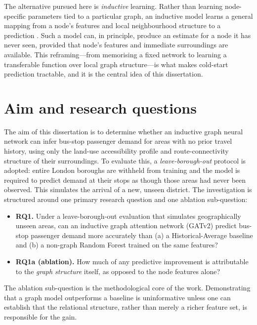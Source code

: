 \documentclass[12pt,a4paper]{report}
\begin{document}
The alternative pursued here is \emph{inductive} learning. Rather than learning
node-specific parameters tied to a particular graph, an inductive model learns
a general mapping from a node's features and local neighbourhood structure to a
prediction \citep{hamilton2017inductive}. Such a model can, in principle,
produce an estimate for a node it has never seen, provided that node's features
and immediate surroundings are available. This reframing---from memorising a
fixed network to learning a transferable function over local graph
structure---is what makes cold-start prediction tractable, and it is the
central idea of this dissertation.

\section{Aim and research questions}
The aim of this dissertation is to determine whether an inductive graph neural
network can infer bus-stop passenger demand for areas with no prior travel
history, using only the land-use accessibility profile and route-connectivity
structure of their surroundings. To evaluate this, a \emph{leave-borough-out}
protocol is adopted: entire London boroughs are withheld from training and the
model is required to predict demand at their stops as though those areas had
never been observed. This simulates the arrival of a new, unseen district.
The investigation is structured around one primary research question and one
ablation sub-question:

\begin{itemize}
  \item \textbf{RQ1.} Under a leave-borough-out evaluation that simulates
  geographically unseen areas, can an inductive graph attention network (GATv2)
  predict bus-stop passenger demand more accurately than (a) a
  Historical-Average baseline and (b) a non-graph Random Forest trained on the
  same features?
  \item \textbf{RQ1a (ablation).} How much of any predictive improvement is
  attributable to the \emph{graph structure} itself, as opposed to the node
  features alone?
\end{itemize}

The ablation sub-question is the methodological core of the work. Demonstrating
that a graph model outperforms a baseline is uninformative unless one can
establish that the relational structure, rather than merely a richer feature
set, is responsible for the gain.
\end{document}
